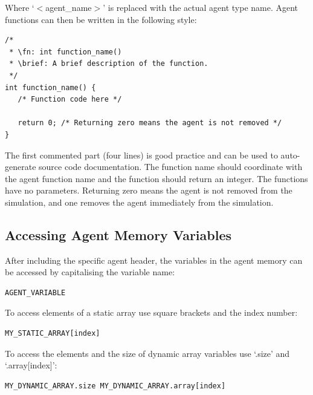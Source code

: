 \documentclass[a4paper,11pt]{article}
\newenvironment{mylisting}
{\begin{list}{}{\setlength{\leftmargin}{1em}}\item\small\bfseries}
{\end{list}}
\begin{document}
Where `$<$agent\_name$>$' is replaced with the actual agent type
name. Agent functions can then be written in the following style:

\begin{mylisting}
\begin{verbatim}
/*
 * \fn: int function_name()
 * \brief: A brief description of the function.
 */
int function_name() {
   /* Function code here */

   return 0; /* Returning zero means the agent is not removed */
}
\end{verbatim}
\end{mylisting}

The first commented part (four lines) is good practice and can be
used to auto-generate source code documentation. The function name
should coordinate with the agent function name and the function
should return an integer. The functions have no parameters.
Returning zero means the agent is not removed from the simulation,
and one removes the agent immediately from the simulation.

\subsection{Accessing Agent Memory Variables}

After including the specific agent header, the variables in the
agent memory can be accessed by capitalising the variable name:

\begin{mylisting}
\begin{verbatim}
AGENT_VARIABLE
\end{verbatim}
\end{mylisting}

To access elements of a static array use square brackets and the
index number:

\begin{mylisting}
\begin{verbatim}
MY_STATIC_ARRAY[index]
\end{verbatim}
\end{mylisting}

To access the elements and the size of dynamic array variables use
`.size' and `.array[index]':

\begin{mylisting}
\begin{verbatim}
MY_DYNAMIC_ARRAY.size MY_DYNAMIC_ARRAY.array[index]
\end{verbatim}
\end{mylisting}
\end{document}
